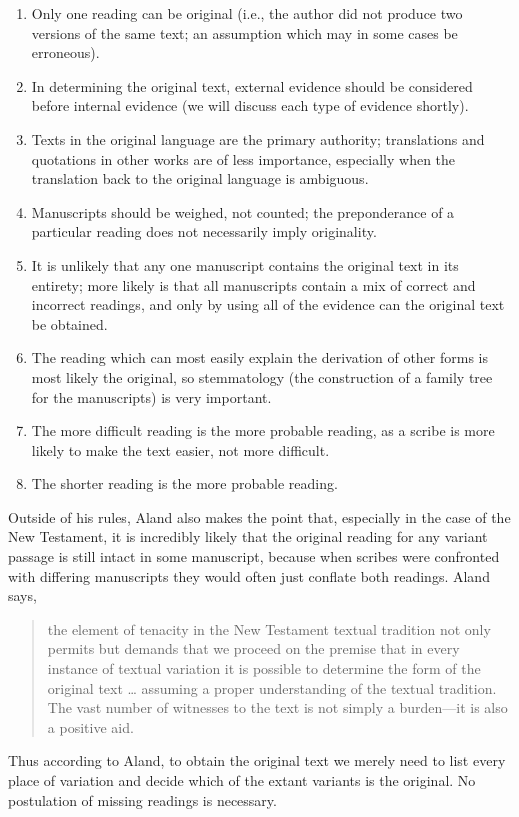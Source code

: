 \documentclass[onecolumn, 12pt]{article}
\begin{document}
\begin{enumerate}
  \item Only one reading can be original (i.e., the author did not produce two
	versions of the same text; an assumption which may in some cases be
	erroneous).
  \item In determining the original text, external evidence should be
	considered before internal evidence (we will discuss each type of evidence
	shortly).
  \item Texts in the original language are the primary authority; translations
	and quotations in other works are of less importance, especially when the
	translation back to the original language is ambiguous.
  \item Manuscripts should be weighed, not counted; the preponderance of a
	particular reading does not necessarily imply originality.
  \item It is unlikely that any one manuscript contains the original text in
	its entirety; more likely is that all manuscripts contain a mix of correct
	and incorrect readings, and only by using all of the evidence can the
	original text be obtained.
  \item The reading which can most easily explain the derivation of other forms
	is most likely the original, so stemmatology (the construction of a family
	tree for the manuscripts) is very important.
  \item The more difficult reading is the more probable reading, as a scribe is
	more likely to make the text easier, not more difficult.
  \item The shorter reading is the more probable reading.
\end{enumerate}

Outside of his rules, Aland also makes the point that, especially in the case
of the New Testament, it is incredibly likely that the original reading for any
variant passage is still intact in some manuscript, because when scribes were
confronted with differing manuscripts they would often just conflate both
readings.  Aland says, 
\begin{quotation}
the element of tenacity in the New Testament textual tradition not only permits
but demands that we proceed on the premise that in every instance of textual
variation it is possible to determine the form of the original text \ldots
assuming a proper understanding of the textual tradition.  The vast number of
witnesses to the text is not simply a burden---it is also a positive
aid.~\cite[294]{aland-text-of-the-new-testament}
\end{quotation}
Thus according to Aland, to obtain the original text we merely
need to list every place of variation and decide which of the extant variants
is the original.  No postulation of missing readings is necessary.
\end{document}
